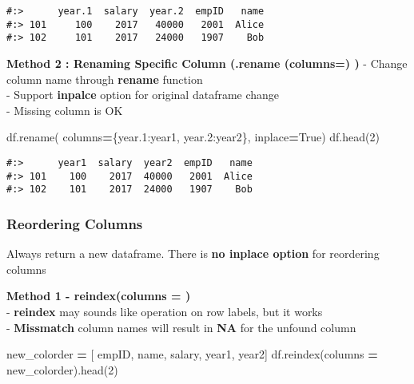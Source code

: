 \documentclass[
]{book}
\newenvironment{Shaded}{\begin{snugshade}}{\end{snugshade}}
\newcommand{\DecValTok}[1]{\textcolor[rgb]{0.06,0.06,0.06}{#1}}
\newcommand{\NormalTok}[1]{#1}
\newcommand{\OperatorTok}[1]{\textcolor[rgb]{0.43,0.43,0.43}{\textbf{#1}}}
\newcommand{\StringTok}[1]{\textcolor[rgb]{0.5,0.5,0.5}{#1}}
\newcommand{\VariableTok}[1]{\textcolor[rgb]{0,0,0}{#1}}
\begin{document}
\begin{verbatim}
#:>      year.1  salary  year.2  empID   name
#:> 101     100    2017   40000   2001  Alice
#:> 102     101    2017   24000   1907    Bob
\end{verbatim}

\textbf{Method 2 : Renaming Specific Column (.rename (columns=) )} - Change column name through \textbf{rename} function\\
- Support \textbf{inpalce} option for original dataframe change\\
- Missing column is OK

\begin{Shaded}
\begin{Highlighting}[]
\NormalTok{df.rename( columns}\OperatorTok{=}\NormalTok{\{}\StringTok{\textquotesingle{}year.1\textquotesingle{}}\NormalTok{:}\StringTok{\textquotesingle{}year1\textquotesingle{}}\NormalTok{, }\StringTok{\textquotesingle{}year.2\textquotesingle{}}\NormalTok{:}\StringTok{\textquotesingle{}year2\textquotesingle{}}\NormalTok{\}, inplace}\OperatorTok{=}\VariableTok{True}\NormalTok{)}
\NormalTok{df.head(}\DecValTok{2}\NormalTok{)}
\end{Highlighting}
\end{Shaded}

\begin{verbatim}
#:>      year1  salary  year2  empID   name
#:> 101    100    2017  40000   2001  Alice
#:> 102    101    2017  24000   1907    Bob
\end{verbatim}

\hypertarget{reordering-columns}{%
\subsubsection{Reordering Columns}\label{reordering-columns}}

Always return a new dataframe. There is \textbf{no inplace option} for reordering columns

\textbf{Method 1 - reindex(columns = )}\\
- \textbf{reindex} may sounds like operation on row labels, but it works\\
- \textbf{Missmatch} column names will result in \textbf{NA} for the unfound column

\begin{Shaded}
\begin{Highlighting}[]
\NormalTok{new\_colorder }\OperatorTok{=}\NormalTok{ [ }\StringTok{\textquotesingle{}empID\textquotesingle{}}\NormalTok{, }\StringTok{\textquotesingle{}name\textquotesingle{}}\NormalTok{, }\StringTok{\textquotesingle{}salary\textquotesingle{}}\NormalTok{, }\StringTok{\textquotesingle{}year1\textquotesingle{}}\NormalTok{, }\StringTok{\textquotesingle{}year2\textquotesingle{}}\NormalTok{]}
\NormalTok{df.reindex(columns }\OperatorTok{=}\NormalTok{ new\_colorder).head(}\DecValTok{2}\NormalTok{)}
\end{Highlighting}
\end{Shaded}
\end{document}
